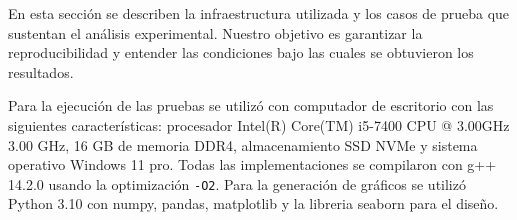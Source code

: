 En esta sección se describen la infraestructura utilizada y los casos de prueba que sustentan el análisis experimental. Nuestro objetivo es garantizar la reproducibilidad y entender las condiciones bajo las cuales se obtuvieron los resultados.

Para la ejecución de las pruebas se utilizó con computador de escritorio con las siguientes características: procesador Intel(R) Core(TM) i5-7400 CPU @ 3.00GHz   3.00 GHz, 16 GB de memoria DDR4, almacenamiento SSD NVMe y sistema operativo Windows 11 pro. Todas las implementaciones se compilaron con g++ 14.2.0 usando la optimización \texttt{-O2}. Para la generación de gráficos se utilizó Python 3.10 con numpy, pandas, matplotlib y la libreria seaborn para el diseño.



